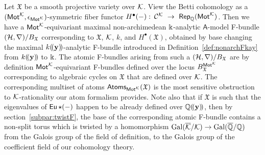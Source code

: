 \documentclass[twoside,leqno]{article}
\numberwithin{equation}{section}
\theoremstyle{plain}
\theoremstyle{definition}
\begin{document}
Let $\mathfrak{X}$ be a smooth projective variety over $\mathcal K$. View the Betti cohomology as a \linebreak $(\mathsf{Mot}^{\mathcal K},\epsilon_{\mathsf{Mot}^{\mathcal K}})$-symmetric fiber functor 
$H^{\bullet}(-) \, \colon \, \mathcal{C}^{\mathcal K} \ \to \ \mathsf{Rep}_{\mathbb Q}(\mathsf{Mot}^{\mathcal K})$. Then we have a $\mathsf{Mot}^{\mathcal K}$-equivariant maximal non-archimedean $\Bbbk$-analytic $\mathsf{A}$-model F-bundle $(\mathcal H,\nabla)/B_{\mathfrak{X}}$   corresponding to $\mathfrak{X}$, $\mathcal K$, $k$, and $H^{\bullet}(\mathfrak{X})$, obtained by base changing the maximal $k(\!(\mathbf{y})\!)$-analytic F-bundle introduced in Definition~\ref{def:nonarchFkay} from $k(\!(\mathbf{y})\!)$ to $\Bbbk$. The atomic F-bundles arising from such a $(\mathcal H,\nabla)/B_{\mathfrak{X}}$ are by definition 
$\mathsf{Mot}^{\mathcal K}$-equivariant F-bundles defined over the locus $B_{\mathfrak{X}}^{\mathsf{Mot}^{\mathcal K}}$ corresponding to algebraic cycles on $\mathfrak{X}$ that are defined over $\mathcal K$. The corresponding multiset of atoms $\mathsf{Atoms}_{\mathsf{Mot}^{\mathcal K}}(\mathfrak{X})$ is the most sensitive obstruction to $\mathcal K$-rationality our atom formalism provides.  Note also that if $\mathfrak{X}$ is such that the eigenvalues of $\operatorname{\mathsf{Eu}}\star(-)$ happen to be already defined over $\mathbb Q(\!(\mathbf{y})\!)$, then by section~\ref{subpar:twistF}, the base of the corresponding atomic F-bundle contains a non-split torus which is twisted by a homomorphism 
$\operatorname{Gal}(\overline{\mathcal K}/\mathcal K) \to \operatorname{Gal}(\overline{\mathbb Q}/\mathbb Q)$ from the Galois group of the field of definition, to the Galois group of the coefficient field of our cohomology theory.

\medskip
\end{document}

